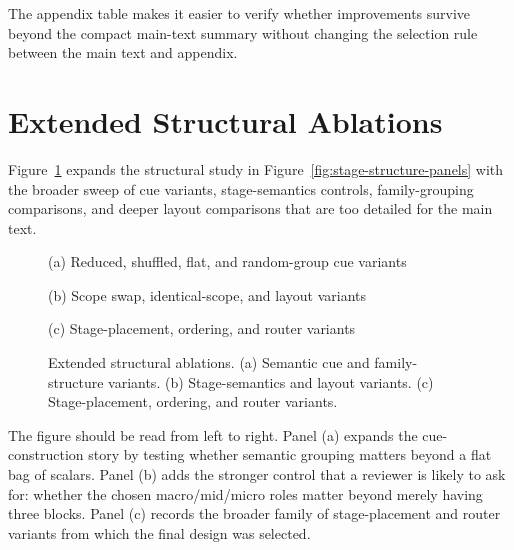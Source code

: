 \documentclass[sigconf,review,anonymous]{acmart}
\newcommand{\placeholderpanel}[1]{\fbox{\rule{0pt}{#1}\rule{0.92\linewidth}{0pt}}}
\begin{document}
The appendix table makes it easier to verify whether improvements survive beyond the compact main-text summary without changing the selection rule between the main text and appendix.

\section{Extended Structural Ablations}
\label{app:stage-layout}
Figure~\ref{fig:appendix-stage-layout} expands the structural study in Figure~\ref{fig:stage-structure-panels} with the broader sweep of cue variants, stage-semantics controls, family-grouping comparisons, and deeper layout comparisons that are too detailed for the main text.

\begin{figure}[t]
  \centering
  \begin{minipage}[t]{0.48\linewidth}
    \centering
    \placeholderpanel{1.05in}

    \vspace{0.35em}
    {\footnotesize (a) Reduced, shuffled, flat, and random-group cue variants}
  \end{minipage}\hfill
  \begin{minipage}[t]{0.48\linewidth}
    \centering
    \placeholderpanel{1.05in}

    \vspace{0.35em}
    {\footnotesize (b) Scope swap, identical-scope, and layout variants}

  \end{minipage}

  \vspace{0.75em}

  \begin{minipage}[t]{\linewidth}
    \centering
    \placeholderpanel{1.15in}

    \vspace{0.35em}
    {\footnotesize (c) Stage-placement, ordering, and router variants}
  \end{minipage}
  \caption{Extended structural ablations. (a) Semantic cue and family-structure variants. (b) Stage-semantics and layout variants. (c) Stage-placement, ordering, and router variants.}
  \label{fig:appendix-stage-layout}
\end{figure}

The figure should be read from left to right. Panel (a) expands the cue-construction story by testing whether semantic grouping matters beyond a flat bag of scalars. Panel (b) adds the stronger control that a reviewer is likely to ask for: whether the chosen macro/mid/micro roles matter beyond merely having three blocks. Panel (c) records the broader family of stage-placement and router variants from which the final design was selected.
\end{document}
